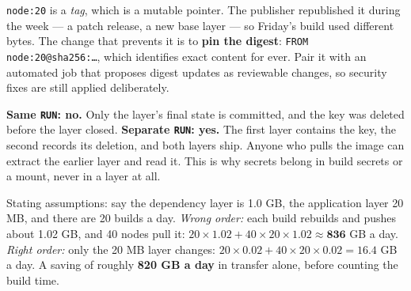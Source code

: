 \begin{ans}
  \item \texttt{node:20} is a \emph{tag}, which is a mutable pointer. The
        publisher republished it during the week --- a patch release, a new base
        layer --- so Friday's build used different bytes. The change that
        prevents it is to \textbf{pin the digest}:
        \texttt{FROM node:20@sha256:\ldots}, which identifies exact content for
        ever. Pair it with an automated job that proposes digest updates as
        reviewable changes, so security fixes are still applied deliberately.
  \item \textbf{Same \texttt{RUN}: no.} Only the layer's final state is
        committed, and the key was deleted before the layer closed.
        \textbf{Separate \texttt{RUN}: yes.} The first layer contains the key,
        the second records its deletion, and both layers ship. Anyone who pulls
        the image can extract the earlier layer and read it. This is why secrets
        belong in build secrets or a mount, never in a layer at all.
  \item Stating assumptions: say the dependency layer is 1.0 GB, the application
        layer 20 MB, and there are 20 builds a day.
        \emph{Wrong order:} each build rebuilds and pushes about 1.02 GB, and
        40 nodes pull it: $20 \times 1.02 + 40 \times 20 \times 1.02 \approx
        \mathbf{836}$ GB a day.
        \emph{Right order:} only the 20 MB layer changes:
        $20 \times 0.02 + 40 \times 20 \times 0.02 = \mathbf{16.4}$ GB a day.
        A saving of roughly \textbf{820 GB a day} in transfer alone, before
        counting the build time.
\end{ans}

